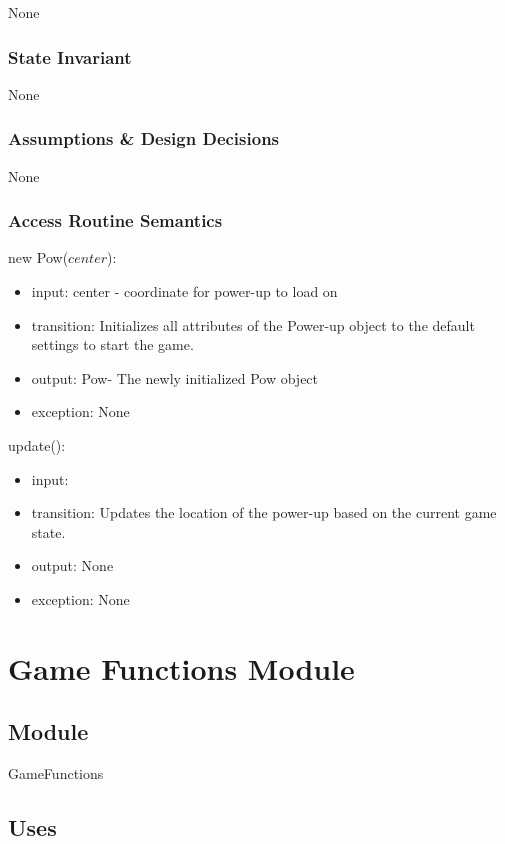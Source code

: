 \documentclass[12pt, titlepage]{article}
\begin{document}
None

\subsubsection* {State Invariant}

None

\subsubsection* {Assumptions \& Design Decisions}

None

\subsubsection* {Access Routine Semantics}

\noindent new Pow($center$):
\begin{itemize}
\item input: center - coordinate for power-up to load on
\item transition: Initializes all attributes of the Power-up object to the default settings to start the game.
\item output: Pow- The newly initialized Pow object
\item exception: None
\end{itemize}

\noindent update():
\begin{itemize}
\item input: 
\item transition: Updates the location of the power-up based on the current game state.
\item output: None
\item exception: None
\end{itemize}

\newpage

\section* {Game Functions Module}

\subsection* {Module}

GameFunctions

\subsection* {Uses}
\end{document}

